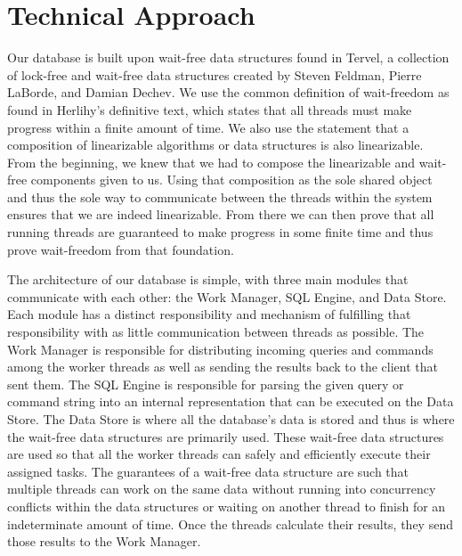 \documentclass[letter,11pt]{article}
\begin{document}
\section{Technical Approach}
Our database is built upon wait-free data structures found in Tervel, a collection of
lock-free and wait-free data structures created by Steven Feldman, Pierre LaBorde, and Damian Dechev\cite{tervel:hazard_pointer}\cite{tervel:hash_map}\cite{tervel:vector}. 
We use the common definition of wait-freedom as found in Herlihy's definitive text, which
states that all threads must make progress within a finite amount of time\cite{herlihy:waitfree}.
We also use the statement that a composition of linearizable algorithms or data structures
is also linearizable. From the beginning, we knew that we had to compose 
the linearizable and wait-free components given to us. Using that composition 
as the sole shared object and thus the sole way to communicate 
between the threads within the system ensures that we are indeed linearizable.
From there we can then prove that all running threads are guaranteed 
to make progress in some finite time and thus prove wait-freedom from that foundation.
\par\vspace{\baselineskip}
The architecture of our database is simple, with three main modules that 
communicate with each other: the Work Manager, SQL Engine, and Data Store.
Each module has a distinct responsibility and mechanism of fulfilling that responsibility with as 
little communication between threads as possible. The Work Manager is responsible for distributing
incoming queries and commands among the worker threads as well as sending the results back to the 
client that sent them. The SQL Engine is responsible for parsing the
given query or command string into an internal representation that can be executed on the Data Store.
The Data Store is where all the database's data is stored and thus is where the wait-free data
structures are primarily used. These wait-free data structures are used so that all
the worker threads can safely and efficiently execute their assigned tasks. The guarantees of a 
wait-free data structure are such that multiple threads can work on the same data without 
running into concurrency conflicts within the data structures or waiting on another thread to 
finish for an indeterminate amount of time. Once the threads calculate their results, they 
send those results to the Work Manager.
\par\vspace{\baselineskip}
\end{document}
